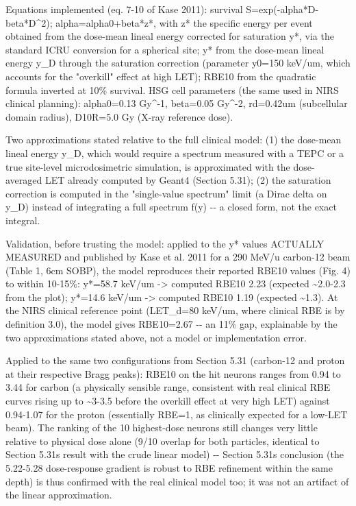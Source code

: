 \documentclass[
  english,
]{article}
\begin{document}
Equations implemented (eq. 7-10 of Kase 2011): survival S=exp(-alpha*D-beta*D\^{}2); alpha=alpha0+beta*z*, with z* the specific energy per event obtained from the dose-mean lineal energy corrected for saturation y*, via the standard ICRU conversion for a spherical site; y* from the dose-mean lineal energy y\_\allowbreak{}D through the saturation correction (parameter y0=150 keV/um, which accounts for the "overkill" effect at high LET); RBE10 from the quadratic formula inverted at 10\% survival. HSG cell parameters (the same used in NIRS clinical planning): alpha0=0.13 Gy\^{}-1, beta=0.05 Gy\^{}-2, rd=0.42um (subcellular domain radius), D10R=5.0 Gy (X-ray reference dose).

Two approximations stated relative to the full clinical model: (1) the dose-mean lineal energy y\_\allowbreak{}D, which would require a spectrum measured with a TEPC or a true site-level microdosimetric simulation, is approximated with the dose-averaged LET already computed by Geant4 (Section 5.31); (2) the saturation correction is computed in the "single-value spectrum" limit (a Dirac delta on y\_\allowbreak{}D) instead of integrating a full spectrum f(y) -\/- a closed form, not the exact integral.

Validation, before trusting the model: applied to the y* values ACTUALLY MEASURED and published by Kase et al. 2011 for a 290 MeV/u carbon-12 beam (Table 1, 6cm SOBP), the model reproduces their reported RBE10 values (Fig. 4) to within 10-15\%: y*=58.7 keV/um -\textgreater{} computed RBE10 2.23 (expected \textasciitilde2.0-2.3 from the plot); y*=14.6 keV/um -\textgreater{} computed RBE10 1.19 (expected \textasciitilde1.3). At the NIRS clinical reference point (LET\_\allowbreak{}d=80 keV/um, where clinical RBE is by definition 3.0), the model gives RBE10=2.67 -\/- an 11\% gap, explainable by the two approximations stated above, not a model or implementation error.

Applied to the same two configurations from Section 5.31 (carbon-12 and proton at their respective Bragg peaks): RBE10 on the hit neurons ranges from 0.94 to 3.44 for carbon (a physically sensible range, consistent with real clinical RBE curves rising up to \textasciitilde3-3.5 before the overkill effect at very high LET) against 0.94-1.07 for the proton (essentially RBE=1, as clinically expected for a low-LET beam). The ranking of the 10 highest-dose neurons still changes very little relative to physical dose alone (9/10 overlap for both particles, identical to Section 5.31\textquotesingle s result with the crude linear model) -\/- Section 5.31\textquotesingle s conclusion (the 5.22-5.28 dose-response gradient is robust to RBE refinement within the same depth) is thus confirmed with the real clinical model too; it was not an artifact of the linear approximation.
\end{document}
